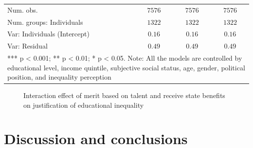 \documentclass[
  10pt]{article}
\begin{document}
\begin{table}
{\begin{center}
{\begin{tabular}{l c c c}
Num. obs.                              & $7576$       & $7576$       & $7576$       \\
Num. groups: Individuals               & $1322$       & $1322$       & $1322$       \\
Var: Individuals (Intercept)           & $0.16$       & $0.16$       & $0.16$       \\
Var: Residual                          & $0.49$       & $0.49$       & $0.49$       \\
\bottomrule
\multicolumn{4}{l}{\scriptsize{*** p < 0.001; ** p < 0.01; * p < 0.05. 
Note: All the models are controlled by educational level, income quintile, subjective social status, age, gender, political position, and inequality perception}}
\end{tabular}
}
\label{table:coefficients}
\end{center}

}

\end{table}%

\begin{figure}[H]


\caption{\label{fig-interact-talent}Interaction effect of merit based on
talent and receive state benefits on justification of educational
inequality}

\end{figure}%

\section{Discussion and conclusions}\label{discussion-and-conclusions}
\end{document}
